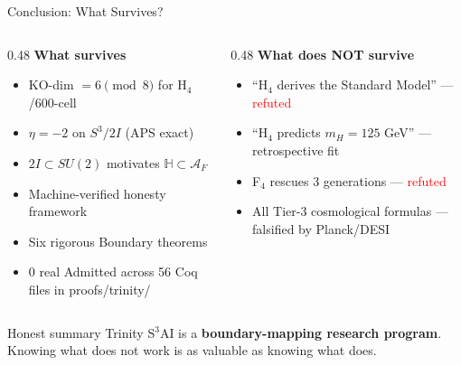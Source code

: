 \documentclass[aspectratio=169,11pt]{beamer}
\begin{document}
\begin{frame}{Conclusion: What Survives?}
  \begin{columns}
    \begin{column}{0.48\textwidth}
      \textbf{What survives}
      \begin{itemize}
        \item KO-dim $= 6 \pmod 8$ for H$_4$/600-cell
        \item $\eta = -2$ on $S^3/2I$ (APS exact)
        \item $2I \subset SU(2)$ motivates $\mathbb{H} \subset \mathcal{A}_F$
        \item Machine-verified honesty framework
        \item Six rigorous Boundary theorems
        \item 0 real Admitted across 56 Coq files in proofs/trinity/
      \end{itemize}
    \end{column}
    \begin{column}{0.48\textwidth}
      \textbf{What does NOT survive}
      \begin{itemize}
        \item ``H$_4$ derives the Standard Model'' --- \textcolor{red}{refuted}
        \item ``H$_4$ predicts $m_H = 125$ GeV'' --- retrospective fit
        \item F$_4$ rescues 3 generations --- \textcolor{red}{refuted}
        \item All Tier-3 cosmological formulas --- falsified by Planck/DESI
      \end{itemize}
    \end{column}
  \end{columns}
  \vfill
  \begin{block}{Honest summary}
    Trinity S$^3$AI is a \textbf{boundary-mapping research program}.\\
    Knowing what does not work is as valuable as knowing what does.
  \end{block}
\end{frame}
\end{document}

